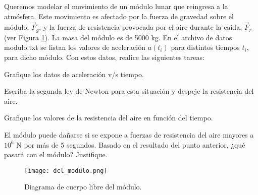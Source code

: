 \documentclass[11pt]{exam}
\begin{document}
\begin{questions}
\item Queremos modelar el movimiento de un módulo lunar que reingresa a la atmósfera. Este movimiento es afectado por la fuerza de gravedad sobre el módulo, $\vec{F}_g$, y la fuerza de resistencia provocada por el aire durante la caída, $\vec{F}_r$ (ver Figura \ref{dcl}). La masa del módulo es de 5000 kg. En el archivo de datos modulo.txt se listan los valores de aceleración $a(t_i)$ para distintos tiempos $t_i$, para dicho módulo. Con estos datos, realice las siguientes tareas:

\begin{parts}
\item  Grafique los datos de aceleración v/s tiempo.
\item Escriba la segunda ley de Newton para esta situación y despeje la resistencia del aire.
\item  Grafique los valores de la resistencia del aire en función del tiempo.
\item El módulo puede dañarse si se expone a fuerzas de resistencia del aire mayores a $10^6$ N por más de 5 segundos. Basado en el resultado del punto anterior, ¿qué pasará con el módulo? Justifique.
\end{parts}
\begin{center}
\begin{figure}[h]
    \centering
    \texttt{[image: dcl\_modulo.png]}    
    \caption{Diagrama de cuerpo libre del módulo.}
    \label{dcl}
\end{figure}
  
\end{center}


\end{questions}
\end{document}
